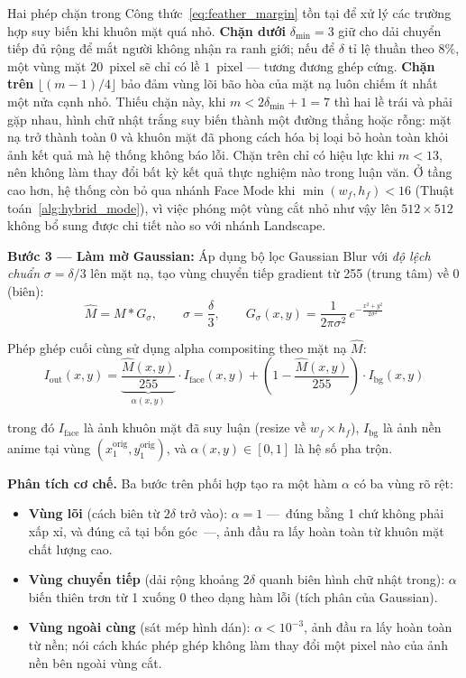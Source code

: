 Hai phép chặn trong Công thức~\eqref{eq:feather_margin} tồn tại để xử lý các trường hợp suy biến khi khuôn mặt quá nhỏ. \textbf{Chặn dưới} $\delta_{\min} = 3$ giữ cho dải chuyển tiếp đủ rộng để mắt người không nhận ra ranh giới; nếu để $\delta$ tỉ lệ thuần theo $8\%$, một vùng mặt $20$~pixel sẽ chỉ có lề $1$~pixel --- tương đương ghép cứng. \textbf{Chặn trên} $\lfloor (m-1)/4 \rfloor$ bảo đảm vùng lõi bão hòa của mặt nạ luôn chiếm ít nhất một nửa cạnh nhỏ. Thiếu chặn này, khi $m < 2\delta_{\min} + 1 = 7$ thì hai lề trái và phải gặp nhau, hình chữ nhật trắng suy biến thành một đường thẳng hoặc rỗng: mặt nạ trở thành toàn 0 và khuôn mặt đã phong cách hóa bị loại bỏ hoàn toàn khỏi ảnh kết quả mà hệ thống không báo lỗi. Chặn trên chỉ có hiệu lực khi $m < 13$, nên không làm thay đổi bất kỳ kết quả thực nghiệm nào trong luận văn. Ở tầng cao hơn, hệ thống còn bỏ qua nhánh Face Mode khi $\min(w_f, h_f) < 16$ (Thuật toán~\ref{alg:hybrid_mode}), vì việc phóng một vùng cắt nhỏ như vậy lên $512 \times 512$ không bổ sung được chi tiết nào so với nhánh Landscape.

\textbf{Bước 3 --- Làm mờ Gaussian:} Áp dụng bộ lọc Gaussian Blur với \textit{độ lệch chuẩn} $\sigma = \delta/3$ lên mặt nạ, tạo vùng chuyển tiếp gradient từ 255 (trung tâm) về 0 (biên):
\begin{equation}
\label{eq:gaussian_blur}
\hat{M} = M * G_\sigma, \qquad \sigma = \frac{\delta}{3}, \qquad G_\sigma(x,y) = \frac{1}{2\pi\sigma^2}\, e^{-\frac{x^2+y^2}{2\sigma^2}}
\end{equation}

Phép ghép cuối cùng sử dụng alpha compositing theo mặt nạ $\hat{M}$:
\begin{equation}
\label{eq:alpha_composite}
I_{\text{out}}(x,y) = \underbrace{\frac{\hat{M}(x,y)}{255}}_{\alpha(x,y)} \cdot I_{\text{face}}(x,y) + \left(1 - \frac{\hat{M}(x,y)}{255}\right) \cdot I_{\text{bg}}(x,y)
\end{equation}

\noindent trong đó $I_{\text{face}}$ là ảnh khuôn mặt đã suy luận (resize về $w_f \times h_f$), $I_{\text{bg}}$ là ảnh nền anime tại vùng $(x_1^{\text{orig}}, y_1^{\text{orig}})$, và $\alpha(x,y) \in [0,1]$ là hệ số pha trộn.

\textbf{Phân tích cơ chế.} Ba bước trên phối hợp tạo ra một hàm $\alpha$ có ba vùng rõ rệt:
\begin{itemize}
    \item \textbf{Vùng lõi} (cách biên từ $2\delta$ trở vào): $\alpha = 1$ ---~đúng bằng 1 chứ không phải xấp xỉ, và đúng cả tại bốn góc~---, ảnh đầu ra lấy hoàn toàn từ khuôn mặt chất lượng cao.
    \item \textbf{Vùng chuyển tiếp} (dải rộng khoảng $2\delta$ quanh biên hình chữ nhật trong): $\alpha$ biến thiên trơn từ 1 xuống 0 theo dạng hàm lỗi (tích phân của Gaussian).
    \item \textbf{Vùng ngoài cùng} (sát mép hình dán): $\alpha < 10^{-3}$, ảnh đầu ra lấy hoàn toàn từ nền; nói cách khác phép ghép không làm thay đổi một pixel nào của ảnh nền bên ngoài vùng cắt.
\end{itemize}

